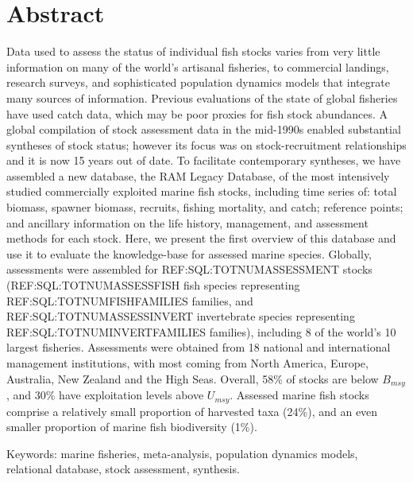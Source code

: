 \section*{Abstract}

Data used to assess the status of individual fish stocks varies from
very little information on many of the world's artisanal fisheries, to
commercial landings, research surveys, and sophisticated population
dynamics models that integrate many sources of information.  Previous
evaluations of the state of global fisheries have used catch data,
which may be poor proxies for fish stock abundances. A global
compilation of stock assessment data in the mid-1990s enabled
substantial syntheses of stock status; however its focus was on
stock-recruitment relationships and it is now 15 years out of date. To
facilitate contemporary syntheses, we have assembled a new database,
the RAM Legacy Database, of the most intensively studied commercially
exploited marine fish stocks, including time series of: total biomass,
spawner biomass, recruits, fishing mortality, and catch; reference
points; and ancillary information on the life history, management, and
assessment methods for each stock.  Here, we present the first
overview of this database and use it to evaluate the knowledge-base
for assessed marine species.  Globally, assessments were assembled for
REF:SQL:TOTNUMASSESSMENT stocks (REF:SQL:TOTNUMASSESSFISH fish species
representing REF:SQL:TOTNUMFISHFAMILIES families, and
REF:SQL:TOTNUMASSESSINVERT invertebrate species representing
REF:SQL:TOTNUMINVERTFAMILIES families), including 8 of the world's 10
largest fisheries. Assessments were obtained from 18 national and
international management institutions, with most coming from North
America, Europe, Australia, New Zealand and the High Seas.  Overall,
58\% of stocks are below $B_{msy}$, and 30\% have exploitation levels above
$U_{msy}$.  Assessed marine fish stocks comprise a relatively small
proportion of harvested taxa (24\%), and an even smaller proportion of
marine fish biodiversity (1\%).



\noindent Keywords: marine fisheries, meta-analysis, population dynamics models, relational database, stock assessment, synthesis.

